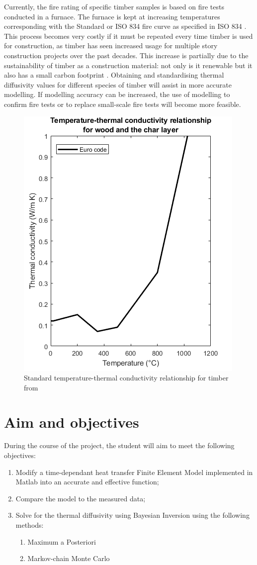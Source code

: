 Currently, the fire rating of specific timber samples is based on fire tests conducted in a furnace. 
The furnace is kept at increasing temperatures corresponding with the Standard or ISO 834 fire curve as specified in ISO 834 \citep{ISO:1999}.
This process becomes very costly if it must be repeated every time timber is used for construction, as timber has seen increased usage for multiple story construction projects over the past decades. 
This increase is partially due to the sustainability of timber as a construction material: not only is it renewable but it also has a small carbon footprint \citep{Salvadori:2017}.
Obtaining and standardising thermal diffusivity values for different species of timber will assist in more accurate modelling.
If modelling accuracy can be increased, the use of modelling to confirm fire tests or to replace small-scale fire tests will become more feasible.

	\begin{figure}
	\centering
	\includegraphics[width = 0.5\linewidth]{figures/Eurok.png}
	\caption{Standard temperature-thermal conductivity relationship for timber from \citep{Euro:2004}}
	\label{kvalue_fig}
	\end{figure}
	
	

\section{Aim and objectives}
During the course of the project, the student will aim to meet the following objectives:
\begin{enumerate}
 \item Modify a time-dependant heat transfer Finite Element Model implemented in Matlab into an accurate and effective function;
 \item Compare the model to the measured data;
 \item Solve for the thermal diffusivity using Bayesian Inversion using the following methods:
 	\begin{enumerate}
 		\item Maximum a Posteriori
 		\item Markov-chain Monte Carlo 	
 	\end{enumerate}
\end{enumerate}


